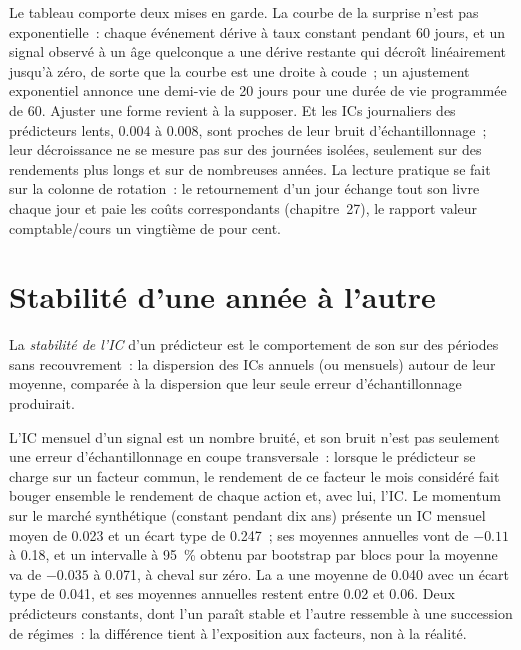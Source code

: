 Le tableau comporte deux mises en garde. La courbe de la surprise n'est pas exponentielle~: chaque événement dérive à taux constant pendant 60 jours, et un signal
observé à un âge quelconque a une dérive restante qui décroît linéairement jusqu'à zéro, de sorte que la courbe est une droite à coude~; un ajustement exponentiel
annonce une demi-vie de 20 jours pour une durée de vie programmée de 60. Ajuster une forme revient à la supposer. Et les ICs journaliers des prédicteurs lents, 0.004 à 0.008,
sont proches de leur bruit d'échantillonnage~; leur décroissance ne se mesure pas sur des journées isolées, seulement sur des rendements plus longs et sur de nombreuses années. La lecture pratique
se fait sur la colonne de rotation~: le retournement d'un jour échange tout son livre chaque jour et paie les coûts correspondants (chapitre~27), le rapport valeur comptable/cours
un vingtième de pour cent.

\section{Stabilité d'une année à l'autre}

\begin{definition}[Stabilité de l'IC]\label{def:rs:half-life-decay-and-stability:stability}
La \emph{stabilité de l'IC} d'un prédicteur est le comportement de son  sur des
périodes sans recouvrement~: la dispersion des ICs annuels (ou mensuels) autour de leur moyenne, comparée à la dispersion que leur seule erreur d'échantillonnage produirait.
\end{definition}

L'IC mensuel d'un signal est un nombre bruité, et son bruit n'est pas seulement une erreur d'échantillonnage en coupe transversale~: lorsque le prédicteur se charge sur
un facteur commun, le rendement de ce facteur le mois considéré fait bouger ensemble le rendement de chaque action et, avec lui, l'IC. Le momentum sur le marché synthétique
(constant pendant dix ans) présente un IC mensuel moyen de 0.023 et un écart type de 0.247~; ses moyennes annuelles vont de $-0.11$ à
0.18, et un intervalle à 95~\% obtenu par bootstrap par blocs pour la moyenne va de $-0.035$ à 0.071, à cheval sur zéro. La  a une moyenne de 0.040
avec un écart type de 0.041, et ses moyennes annuelles restent entre 0.02 et 0.06. Deux prédicteurs constants, dont l'un paraît stable et
l'autre ressemble à une succession de régimes~: la différence tient à l'exposition aux facteurs, non à la réalité.

